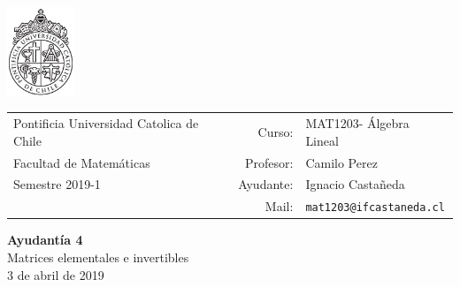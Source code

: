 \documentclass[12pt]{article}
\makeatletter
\newcommand{\ayudantia}{{\sc Ayudantía 4}}
\newcommand{\tituloayu}{Matrices elementales e invertibles}
\newcommand{\fecha}{3 de abril de 2019}
\newcommand{\sigla}{MAT1203}
\newcommand{\nombre}{Álgebra Lineal}
\newcommand{\profesor}{Camilo Perez}
\newcommand{\ano}{2019}
\newcommand{\semestre}{1}
\newcommand{\mail}{mat1203@ifcastaneda.cl}
\makeatother
\begin{document}
\thispagestyle{empty}

\begin{minipage}{2cm}
	\includegraphics[width=2cm]{../../../../img/logo.pdf}
	\vspace{0.5cm}
\end{minipage}
\begin{minipage}{\linewidth}
	\begin{tabular}{lrl}
		{\scriptsize\sc Pontificia Universidad Catolica de Chile} & \hspace*{0.7in}Curso: &
		\sigla  - \nombre\\
		{\sc Facultad de Matemáticas}&
		Profesor: & \profesor \\
		{\sc Semestre \ano-\semestre} & Ayudante: & {Ignacio Castañeda}\\
		& {Mail:} & \texttt{\mail}
	\end{tabular}
\end{minipage}

\vspace{-10mm}
\begin{center}
	{\LARGE\bf \ayudantia}\\
	\vspace{0.1cm}
	{\tituloayu}\\
	\vspace{0.1cm}
	\fecha\\
	\vspace{0.4cm}
\end{center}
\end{document}
